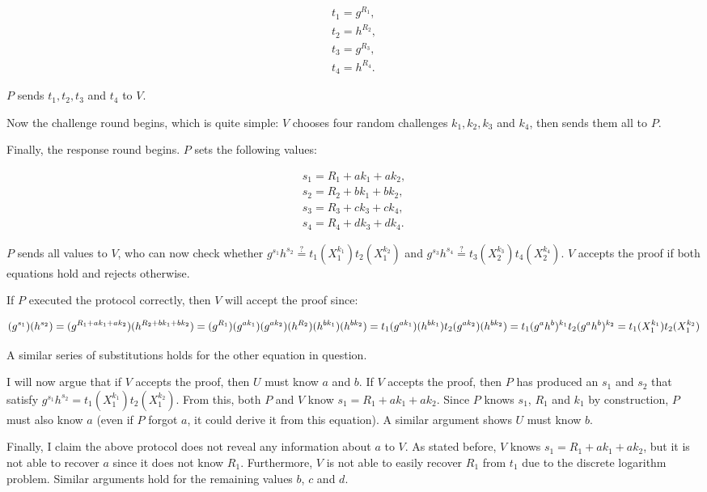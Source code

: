 \documentclass[11pt]{article}
\begin{document}
\begin{eqnarray}
	t_1=g^{R_1}, \\
	t_2=h^{R_2}, \\
	t_3=g^{R_3}, \\
	t_4=h^{R_4}. 
\end{eqnarray}

$P$ sends $t_1, t_2, t_3$ and $t_4$ to $V$. 

Now the challenge round begins, which is quite simple: $V$ chooses four random challenges $k_1, k_2, k_3$ and $k_4$, then sends them all to $P$.

Finally, the response round begins. $P$ sets the following values:

\begin{eqnarray}
	s_1 = R_1 + ak_1 + ak_2, \\
	s_2 = R_2 + bk_1 + bk_2, \\
	s_3 = R_3 + ck_3 + ck_4, \\
	s_4 = R_4 + dk_3 + dk_4.
\end{eqnarray}

$P$ sends all values to $V$, who can now check whether $g^{s_1}h^{s_2} \stackrel{?}{=} t_1(X_1^{k_1})t_2(X_1^{k_2})$ and $g^{s_3}h^{s_4} \stackrel{?}{=} t_3(X_2^{k_3})t_4(X_2^{k_4})$. $V$ accepts the proof if both equations hold and rejects otherwise. 

If $P$ executed the protocol correctly, then $V$ will accept the proof since:

\begin{dmath}
	(g^{s_1})(h^{s_2}) = (g^{R_1 + ak_1 + ak_2})(h^{R_2 + bk_1 + bk_2}) \\
	= (g^{R_1}) (g^{ak_1}) (g^{ak_2}) (h^{R_2}) (h^{bk_1}) (h^{bk_2}) \\
	= t_1 (g^{ak_1}) (h^{bk_1}) t_2 (g^{ak_2}) (h^{bk_2}) \\
	=  t_1 (g^ah^b)^{k_1} t_2 (g^ah^b)^{k_2} \\
	=  t_1 (X_1^{k_1}) t_2 (X_1^{k_2})
\end{dmath}

A similar series of substitutions holds for the other equation in question. 

I will now argue that if $V$ accepts the proof, then $U$ must know $a$ and $b$. If $V$ accepts the proof, then $P$ has produced an $s_1$ and $s_2$ that satisfy  $g^{s_1}h^{s_2} = t_1(X_1^{k_1})t_2(X_1^{k_2})$. From this, both $P$ and $V$ know $s_1 = R_1 + ak_1 + ak_2$. Since $P$ knows $s_1$, $R_1$ and $k_1$ by construction, $P$ must also know $a$ (even if $P$ forgot $a$, it could derive it from this equation). A similar argument shows $U$ must know $b$.
	
Finally, I claim the above protocol does not reveal any information about $a$ to $V$. As stated before, $V$ knows $s_1 = R_1 + ak_1 + ak_2$, but it is not able to recover $a$ since it does not know $R_1$. Furthermore, $V$ is not able to easily recover $R_1$ from $t_1$ due to the discrete logarithm problem. Similar arguments hold for the remaining values $b$, $c$ and $d$.
\end{document}
